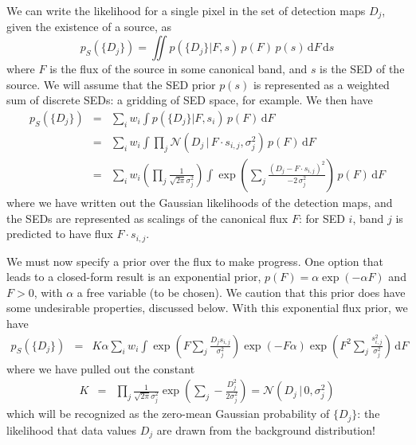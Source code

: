 \documentclass[letterpaper,preprint]{aastex62}
\newcommand{\gaussianN}{\mathcal{N}}
\newcommand{\gaussian}[1]{\gaussianN\!\left(#1\right)}
\newcommand{\dd}{\mathrm{d}}
\begin{document}
We can write the likelihood for a single pixel in the set of detection
maps $D_j$, given the existence of a source, as
\begin{equation}
  p_S(\{ D_j \}) = \iint p(\{ D_j \} | F, s) \, p(F) \, p(s) \, \dd F \, \dd s
\end{equation}
where $F$ is the flux of the source in some canonical band, and $s$ is
the SED of the source.  We will assume that the SED prior $p(s)$ is
represented as a weighted sum of discrete SEDs: a gridding of SED
space, for example.  We then have
\begin{eqnarray}
  p_S(\{ D_j \})
  &=&
  \sum_{i} w_i \int p(\{ D_j \} | F, s_i) \, p(F) \, \dd F
  \\
  &=&
  \sum_i w_i \int \prod_j \gaussian{D_j \,|\, F \cdot s_{i,j}, \sigma_j^2} \, p(F) \, \dd F
  \\
  &=&
  \sum_i w_i 
  \left( \prod_j \frac{1}{\sqrt{2 \pi} \sigma_j^2} \right)
  \int 
    \exp{ \left( \sum_j \frac{(D_j - F \cdot s_{i,j})^2}{-2 \, \sigma_j^2} \right) }
    \, p(F) \, \dd F
\end{eqnarray}
%
where we have written out the Gaussian likelihoods of the detection
maps, and the SEDs are represented as scalings of the canonical flux
$F$: for SED $i$, band $j$ is predicted to have flux $F \cdot
s_{i,j}$.

We must now specify a prior over the flux to make progress.  One
option that leads to a closed-form result is an exponential prior,
$p(F) = \alpha \exp(-\alpha F)$ and $F > 0$, with $\alpha$ a free
variable (to be chosen).  We caution that this prior does have some
undesirable properties, discussed below.  With this exponential flux
prior, we have
\begin{eqnarray}
  p_S(\{ D_j \})
  &=&
  K \alpha
  \sum_i w_i 
  \int 
    \exp{ \left( F \sum_j \frac{D_j s_{i,j}}{\sigma_j^2} \right)}
    \exp{ \left( -F \alpha \right)}
    \exp{ \left( F^2 \sum_j \frac{s_{i,j}^2}{\sigma_j^2} \right)}
    \, \dd F
\end{eqnarray}
where we have pulled out the constant
\begin{eqnarray}
K &=& \prod_j \frac{1}{\sqrt{2 \pi} \sigma_j^2} 
\exp{\left( \sum_j -\frac{D_j^2}{2 \sigma_j^2} \right)}
= \gaussian{D_j \,|\, 0, \sigma_j^2}
\label{eq:pbg}
\end{eqnarray}
which will be recognized as the zero-mean Gaussian probability of
$\{D_j\}$: the likelihood that data values $D_j$ are drawn from the
background distribution!
\end{document}
